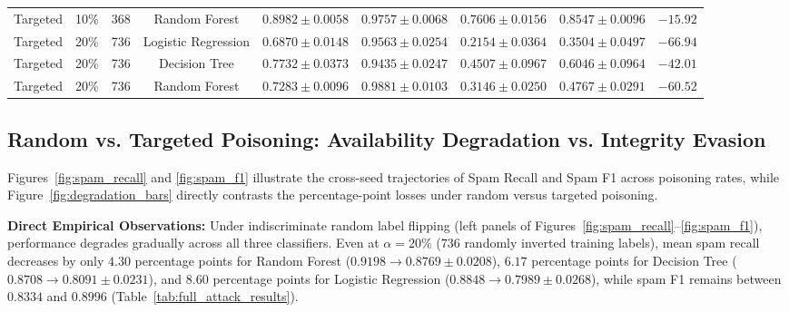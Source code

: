 \documentclass[10pt,conference]{IEEEtran}
\begin{document}
\begin{table}[htbp]
\begin{tabular}{llccccccc}
Targeted & 10\% & 368 & Random Forest & $\mathbf{0.8982 \pm 0.0058}$ & $\mathbf{0.9757 \pm 0.0068}$ & $0.7606 \pm 0.0156$ & $\mathbf{0.8547 \pm 0.0096}$ & $-15.92$ \\
Targeted & 20\% & 736 & Logistic Regression & $0.6870 \pm 0.0148$ & $0.9563 \pm 0.0254$ & $0.2154 \pm 0.0364$ & $0.3504 \pm 0.0497$ & $-66.94$ \\
Targeted & 20\% & 736 & Decision Tree & $\mathbf{0.7732 \pm 0.0373}$ & $0.9435 \pm 0.0247$ & $\mathbf{0.4507 \pm 0.0967}$ & $\mathbf{0.6046 \pm 0.0964}$ & $\mathbf{-42.01}$ \\
Targeted & 20\% & 736 & Random Forest & $0.7283 \pm 0.0096$ & $\mathbf{0.9881 \pm 0.0103}$ & $0.3146 \pm 0.0250$ & $0.4767 \pm 0.0291$ & $-60.52$ \\
\bottomrule
\end{tabular}
\end{table}

\subsection{Random vs. Targeted Poisoning: Availability Degradation vs. Integrity Evasion}
Figures~\ref{fig:spam_recall} and \ref{fig:spam_f1} illustrate the cross-seed trajectories of Spam Recall and Spam F1 across poisoning rates, while Figure~\ref{fig:degradation_bars} directly contrasts the percentage-point losses under random versus targeted poisoning.

\textbf{Direct Empirical Observations:} Under indiscriminate random label flipping (left panels of Figures~\ref{fig:spam_recall}--\ref{fig:spam_f1}), performance degrades gradually across all three classifiers. Even at $\alpha = 20\%$ ($736$ randomly inverted training labels), mean spam recall decreases by only $4.30$ percentage points for Random Forest ($0.9198 \to 0.8769 \pm 0.0208$), $6.17$ percentage points for Decision Tree ($0.8708 \to 0.8091 \pm 0.0231$), and $8.60$ percentage points for Logistic Regression ($0.8848 \to 0.7989 \pm 0.0268$), while spam F1 remains between $0.8334$ and $0.8996$ (Table~\ref{tab:full_attack_results}).
\end{document}
